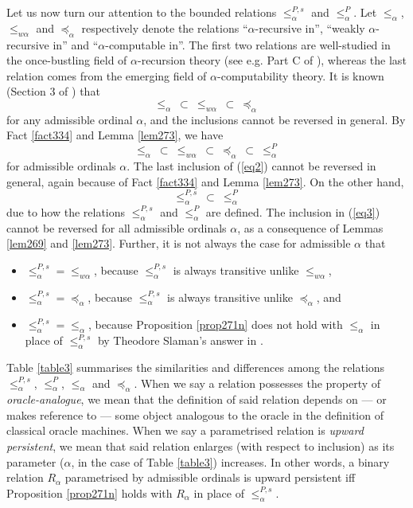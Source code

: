 \documentclass[12pt, twoside]{memoir}
\numberwithin{equation}{section}
\theoremstyle{definition}
\theoremstyle{remark}
\theoremstyle{definition}
\theoremstyle{definition}
\theoremstyle{definition}
\theoremstyle{remark}
\begin{document}
Let us now turn our attention to the bounded relations $\leq^{P, s}_{\alpha}$ and $\leq^P_{\alpha}$. Let $\leq_{\alpha}$, $\leq_{w \alpha}$ and $\preceq_{\alpha}$ respectively denote the relations ``$\alpha$-recursive in'', ``weakly $\alpha$-recursive in'' and ``$\alpha$-computable in''. The first two relations are well-studied in the once-bustling field of $\alpha$-recursion theory (see e.g. Part C of \cite{sacks}), whereas the last relation comes from the emerging field of $\alpha$-computability theory. It is known (Section 3 of \cite{koepke2}) that 
\begin{equation*}
    \leq_{\alpha} \ \subset \ \leq_{w \alpha} \ \subset \ \preceq_{\alpha}
\end{equation*}
for any admissible ordinal $\alpha$, and the inclusions cannot be reversed in general. By Fact \ref{fact334} and Lemma \ref{lem273}, we have
\begin{equation}\label{eq2}
    \leq_{\alpha} \ \subset \ \leq_{w \alpha} \ \subset \ \preceq_{\alpha} \ \subset \ \leq^P_{\alpha}
\end{equation}
for admissible ordinals $\alpha$. The last inclusion of (\ref{eq2}) cannot be reversed in general, again because of Fact \ref{fact334} and Lemma \ref{lem273}. On the other hand, 
\begin{equation}\label{eq3}
    \leq^{P, s}_{\alpha} \ \subset \ \leq^P_{\alpha}
\end{equation}
due to how the relations $\leq^{P, s}_{\alpha}$ and $\leq^P_{\alpha}$ are defined. The inclusion in  (\ref{eq3}) cannot be reversed for all admissible ordinals $\alpha$, as a consequence of Lemmas \ref{lem269} and \ref{lem273}. Further, it is not always the case for admissible $\alpha$ that
\begin{itemize}
    \item $\leq^{P, s}_{\alpha} = \leq_{w \alpha}$, because $\leq^{P, s}_{\alpha}$ is always transitive unlike $\leq_{w \alpha}$,
    \item $\leq^{P, s}_{\alpha} = \preceq_{\alpha}$, because $\leq^{P, s}_{\alpha}$ is always transitive unlike $\preceq_{\alpha}$, and
    \item $\leq^{P, s}_{\alpha} = \leq_{\alpha}$, because Proposition \ref{prop271n} does not hold with $\leq_{\alpha}$ in place of $\leq^{P, s}_{\alpha}$ by Theodore Slaman's answer in \cite{slaman}.
\end{itemize}

Table \ref{table3} summarises the similarities and differences among the relations $\leq^{P, s}_{\alpha}$, $\leq^P_{\alpha}$, $\leq_{\alpha}$ and $\preceq_{\alpha}$. When we say a relation possesses the property of \textit{oracle-analogue}, we mean that the definition of said relation depends on --- or makes reference to --- some object analogous to the oracle in the definition of classical oracle machines. When we say a parametrised relation is \textit{upward persistent}, we mean that said relation enlarges (with respect to inclusion) as its parameter ($\alpha$, in the case of Table \ref{table3}) increases. In other words, a binary relation $R_{\alpha}$ parametrised by admissible ordinals is upward persistent iff Proposition \ref{prop271n} holds with $R_{\alpha}$ in place of $\leq^{P, s}_{\alpha}$.
\end{document}
